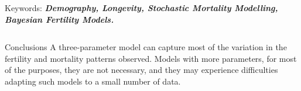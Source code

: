 \documentclass[]{beamer}
\begin{document}
\begin{frame}{\vspace{1ex}\hfill Keywords: \bfseries \textit{Demography, Longevity, Stochastic Mortality Modelling, Bayesian Fertility Models.}}
\begin{columns}[t]
			\noindent
			\begin{minipage}{.999\columnwidth}
				\begin{block}{Conclusions}\vspace{-0.6cm}
				A three-parameter model can capture most of the variation in the fertility and mortality patterns observed. Models with more parameters, for most of the purposes, they are not necessary, and they may experience difficulties adapting such models to a small number of data.

\end{block}
\end{minipage}
\end{columns}
\end{frame}
\end{document}
